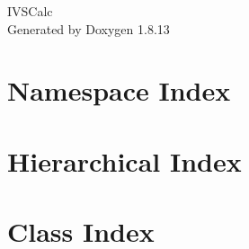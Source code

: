 \documentclass[twoside]{book}
\newcommand{\+}{\discretionary{\mbox{\scriptsize$\hookleftarrow$}}{}{}}
\newcommand{\clearemptydoublepage}{%
  \newpage{\pagestyle{empty}\cleardoublepage}%
}
\begin{document}
\hypersetup{pageanchor=false,
             bookmarksnumbered=true,
             pdfencoding=unicode
            }
\begin{titlepage}
\vspace*{7cm}
\begin{center}%
{\Large I\+V\+S\+Calc }\\
\vspace*{1cm}
{\large Generated by Doxygen 1.8.13}\\
\end{center}
\end{titlepage}
\clearemptydoublepage
{}
\tableofcontents
\clearemptydoublepage
{}
\hypersetup{pageanchor=true}

\chapter{Namespace Index}

\chapter{Hierarchical Index}

\chapter{Class Index}

\end{document}
